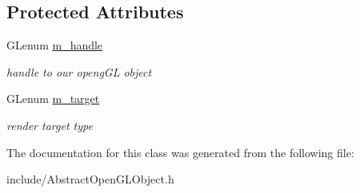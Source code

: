 \subsection*{Protected Attributes}
\begin{DoxyCompactItemize}
\item 
\hypertarget{class_abstract_open_gl_object_ac13baa5b84c78568317b014d3381fb85}{G\-Lenum \hyperlink{class_abstract_open_gl_object_ac13baa5b84c78568317b014d3381fb85}{m\-\_\-handle}}\label{class_abstract_open_gl_object_ac13baa5b84c78568317b014d3381fb85}

\begin{DoxyCompactList}\small\item\em handle to our openg\-G\-L object \end{DoxyCompactList}\item 
\hypertarget{class_abstract_open_gl_object_adb63c973aa5d7e239e903cea5b507ff2}{G\-Lenum \hyperlink{class_abstract_open_gl_object_adb63c973aa5d7e239e903cea5b507ff2}{m\-\_\-target}}\label{class_abstract_open_gl_object_adb63c973aa5d7e239e903cea5b507ff2}

\begin{DoxyCompactList}\small\item\em render target type \end{DoxyCompactList}\end{DoxyCompactItemize}


The documentation for this class was generated from the following file\-:\begin{DoxyCompactItemize}
\item 
include/Abstract\-Open\-G\-L\-Object.\-h\end{DoxyCompactItemize}
